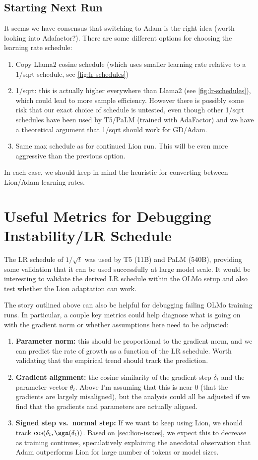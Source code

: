 \documentclass{article}
\begin{document}
\subsection{Starting Next Run}

It seems we have consensus that switching to Adam is the right idea (worth looking into Adafactor?). There are some different options for choosing the learning rate schedule:
\begin{enumerate}
    \item Copy Llama2 cosine schedule (which uses smaller learning rate relative to a 1/sqrt schedule, see \autoref{fig:lr-schedules})
    \item 1/sqrt: this is actually higher everywhere than Llama2 (see \autoref{fig:lr-schedules}), which could lead to more sample efficiency. However there is possibly some risk that our exact choice of schedule is untested, even though other 1/sqrt schedules have been used by T5/PaLM (trained with AdaFactor) and we have a theoretical argument that 1/sqrt should work for GD/Adam.
    \item Same max schedule as for continued Lion run. This will be even more aggressive than the previous option.
\end{enumerate}
In each case, we should keep in mind the heuristic for converting between Lion/Adam learning rates.

\section{Useful Metrics for Debugging Instability/LR Schedule}

The LR schedule of $1/\sqrt{t}$ was used by T5 (11B) and PaLM (540B), providing some validation that it can be used successfully at large model scale. It would be interesting to validate the derived LR schedule within the OLMo setup and also test whether the Lion adaptation can work.

The story outlined above can also be helpful for debugging failing OLMo training runs. In particular, a couple key metrics could help diagnose what is going on with the gradient norm or whether assumptions here need to be adjusted:
\begin{enumerate}
    \item \textbf{Parameter norm:} this should be proportional to the gradient norm, and we can predict the rate of growth as a function of the LR schedule. Worth validating that the empirical trend should track the prediction.
    \item \textbf{Gradient alignment:} the cosine similarity of the gradient step $\delta_t$ and the parameter vector $\theta_t$. Above I'm assuming that this is near $0$ (that the gradients are largely misaligned), but the analysis could all be adjusted if we find that the gradients and parameters are actually aligned.
    \item \textbf{Signed step vs.~normal step:} If we want to keep using Lion, we should track $\cos(\delta_t, \sgn(\delta_t))$. Based on \autoref{sec:lion-issues}, we expect this to decrease as training continues, speculatively explaining the anecdotal observation that Adam outperforms Lion for large number of tokens or model sizes.
\end{enumerate}



\end{document}
